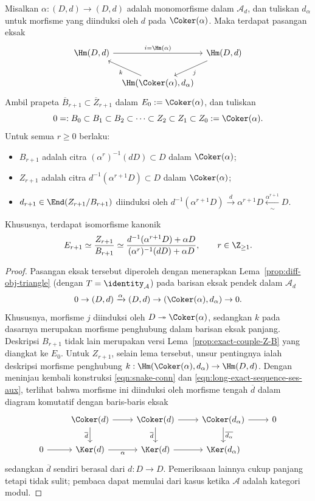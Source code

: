 \begin{proposition}\label{prop:differential-exact-couple}
	Misalkan $\alpha:(D,d)\to(D,d)$ adalah monomorfisme dalam $\mathcal{A}_d$,
	dan tuliskan $d_\alpha$ untuk morfisme yang diinduksi oleh $d$ pada
	$\Coker(\alpha)$. Maka terdapat pasangan eksak
	\[\begin{tikzcd}[column sep=tiny]
		\Hm(D,d) \arrow[rr, "{i=\Hm(\alpha)}"] & &
		\Hm(D,d) \arrow[ld, "j"] \\
		& \Hm(\Coker(\alpha),d_\alpha) \arrow[lu, "k"] &
	\end{tikzcd}\]
	Ambil prapeta $\overline{B}_{r+1}\subset\overline{Z}_{r+1}$ dalam
	$E_0:=\Coker(\alpha)$, dan tuliskan
	\[ 0=:B_0\subset B_1\subset B_2\subset\cdots\subset Z_2\subset Z_1
	\subset Z_0:=\Coker(\alpha). \]
	Untuk semua $r\geq0$ berlaku:
	\begin{itemize}
		\item $B_{r+1}$ adalah citra
		$(\alpha^r)^{-1}(dD)\subset D$ dalam $\Coker(\alpha)$;
		\item $Z_{r+1}$ adalah citra
		$d^{-1}(\alpha^{r+1}D)\subset D$ dalam $\Coker(\alpha)$;
		\item $d_{r+1}\in\End(Z_{r+1}/B_{r+1})$ diinduksi oleh
		$d^{-1}(\alpha^{r+1}D)\xrightarrow{d}\alpha^{r+1}D
		\xleftarrow[\sim]{\alpha^{r+1}}D$.
	\end{itemize}
	Khususnya, terdapat isomorfisme kanonik
	\[ E_{r+1}\simeq\dfrac{Z_{r+1}}{B_{r+1}}
	\simeq\dfrac{d^{-1}(\alpha^{r+1}D)+\alpha D}
	{(\alpha^r)^{-1}(dD)+\alpha D},\qquad r\in\Z_{\geq1}. \]
\end{proposition}
\begin{proof}
	Pasangan eksak tersebut diperoleh dengan menerapkan
	Lema~\ref{prop:diff-obj-triangle} (dengan
	$T=\identity_{\mathcal{A}}$) pada barisan eksak pendek dalam
	$\mathcal{A}_d$
	\[ 0\to(D,d)\xrightarrow{\alpha}(D,d)
	\to(\Coker(\alpha),d_\alpha)\to0. \]
	Khususnya, morfisme $j$ diinduksi oleh
	$D\twoheadrightarrow\Coker(\alpha)$, sedangkan $k$ pada dasarnya merupakan
	morfisme penghubung dalam barisan eksak panjang. Deskripsi $B_{r+1}$ tidak
	lain merupakan versi Lema~\ref{prop:exact-couple-Z-B} yang diangkat ke $E_0$.
	Untuk $Z_{r+1}$, selain lema tersebut, unsur pentingnya ialah deskripsi
	morfisme penghubung
	$k:\Hm(\Coker(\alpha),d_\alpha)\to\Hm(D,d)$. Dengan meninjau kembali
	konstruksi \eqref{eqn:snake-conn} dan
	\eqref{eqn:long-exact-sequence-ses-aux}, terlihat bahwa morfisme ini
	diinduksi oleh morfisme tengah $\overline{d}$ dalam diagram komutatif dengan
	baris-baris eksak
	\[\begin{tikzcd}
		& \Coker(d) \arrow[r] \arrow[d, "\overline{d}"'] &
		\Coker(d) \arrow[r] \arrow[d, "\overline{d}"'] &
		\Coker(d_\alpha) \arrow[d, "\overline{d_\alpha}"] \arrow[r] & 0 \\
		0 \arrow[r] & \Ker(d) \arrow[r, "\alpha"'] &
		\Ker(d) \arrow[r] & \Ker(d_\alpha) &
	\end{tikzcd}\]
	sedangkan $\overline{d}$ sendiri berasal dari $d:D\to D$. Pemeriksaan
	lainnya cukup panjang tetapi tidak sulit; pembaca dapat memulai dari kasus ketika
	$\mathcal{A}$ adalah kategori modul.
\end{proof}

